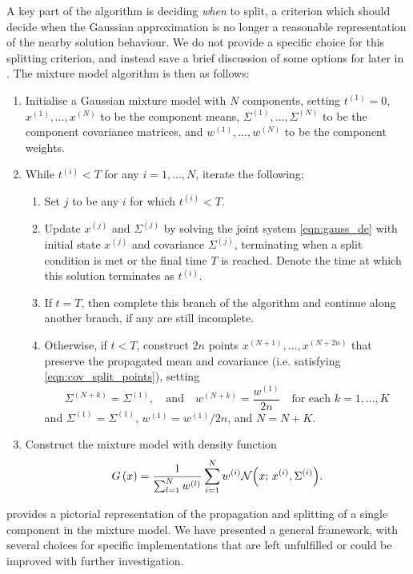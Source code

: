 A key part of the algorithm is deciding \emph{when} to split, a criterion which should decide when the Gaussian approximation is no longer a reasonable representation of the nearby solution behaviour.
We do not provide a specific choice for this splitting criterion, and instead save a brief discussion of some options for later in .
The mixture model algorithm is then as follows:
\begin{enumerate}
	\item Initialise a Gaussian mixture model with \(N\) components, setting \(t^{(1)} = 0\), \(x^{(1)},\dotsc, x^{(N)}\) to be the component means, \(\Sigma^{(1)}, \dotsc, \Sigma^{(N)}\) to be the component covariance matrices, and \(w^{(1)}, \dotsc, w^{(N)}\) to be the component weights.

	\item While \(t^{(i)} < T\) for any \(i = 1,\dotsc, N\), iterate the following;

	      \begin{enumerate}
		      \item Set \(j\) to be any \(i\) for which \(t^{(i)} < T\).

		      \item Update \(x^{(j)}\) and \(\Sigma^{(j)}\) by solving the joint system \cref{eqn:gauss_de} with initial state \(x^{(j)}\) and covariance \(\Sigma^{(j)}\), terminating when a split condition is met or the final time \(T\) is reached.
		            Denote the time at which this solution terminates as \(t^{(i)}\).

		      \item If \(t = T\), then complete this branch of the algorithm and continue along another branch, if any are still incomplete.

		      \item Otherwise, if \(t < T\), construct \(2n\) points \(x^{(N + 1)},\dotsc,x^{(N + 2n)}\) that preserve the propagated mean and covariance (i.e. satisfying \cref{eqn:cov_split_points}), setting
		            \[
			            \Sigma^{(N + k)} = \Sigma^{(1)}, \quad \text{and} \quad w^{(N + k)} = \frac{w^{(1)}}{2n} \quad \text{for each } k = 1,\dotsc,K
		            \]
		            and \(\Sigma^{(1)} = \Sigma^{(1)}\), \(w^{(1)} = w^{(1)} / 2n\), and \(N = N + K\).
	      \end{enumerate}

	\item Construct the mixture model with density function
	      \[
		      G\left(x\right) = \frac{1}{\sum_{l=1}^{N}w^{(l)}}\sum_{i=1}^{N}{w^{(i)}\mathcal{N}\!\left(x; \, x^{(i)}, \Sigma^{(i)}\right)}.
	      \]

\end{enumerate}
 provides a pictorial representation of the propagation and splitting of a single component in the mixture model.
We have presented a general framework, with several choices for specific implementations that are left unfulfilled or could be improved with further investigation.

